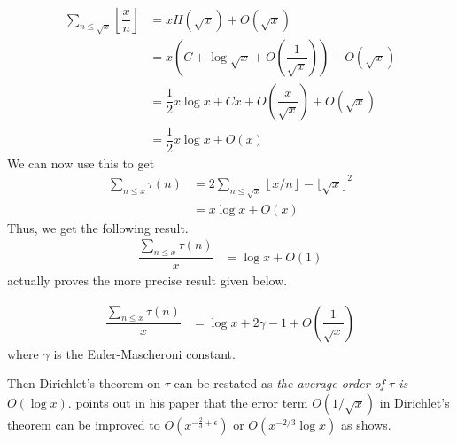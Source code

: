 \documentclass[elemannt.tex]{subfile}
\begin{document}
		\begin{align*}
			\sum_{n\leq \sqrt{x}}\left\lfloor{\dfrac{x}{n}}\right\rfloor
				& = xH(\sqrt{x})+O(\sqrt{x})\\
				& = x\left(C+\log{\sqrt{x}}+O\left(\dfrac{1}{\sqrt{x}}\right)\right)+O(\sqrt{x})\\
				& = \dfrac{1}{2}x\log{x}+Cx+O\left(\dfrac{x}{\sqrt{x}}\right)+O(\sqrt{x})\\
				& = \dfrac{1}{2}x\log{x}+O(x)
		\end{align*}
	We can now use this to get
		\begin{align*}
			\sum_{n\leq x}\tau(n)
				& = 2\sum_{n\leq \sqrt{x}}\left\lfloor{x/n}\right\rfloor-\lfloor{\sqrt{x}}\rfloor^{2}\\
				& = x\log{x}+O(x)
		\end{align*}
	Thus, we get the following result.
		\begin{align*}
			\dfrac{\sum_{n\leq x}\tau(n)}{x}
				& = \log{x}+O(1)
		\end{align*}
	\textcite{dirichlet_1897} actually proves the more precise result given below.
		\begin{theorem}\label{thm:dirtau}
				\begin{align*}
					\dfrac{\sum_{n\leq x}\tau(n)}{x}
						& = \log{x}+2\gamma-1+O\left(\dfrac{1}{\sqrt{x}}\right)
				\end{align*}
			where $\gamma$ is the Euler-Mascheroni constant.
		\end{theorem}
	Then Dirichlet's theorem on $\tau$ can be restated as \textit{the average order of $\tau$ is }$O(\log{x})$. \textcite{aiyangar_hardy_vennkatesvara_seshu_aiyar_p_wilson_1927} points out in his paper that the error term $O(1/\sqrt{x})$ in Dirichlet's theorem can be improved to $O\left(x^{-\frac{2}{3}+\epsilon}\right)$ or $O\left(x^{-2/3}\log{x}\right)$ as \textcite[Page $689$]{landau_1912} shows.
	
\end{document}
